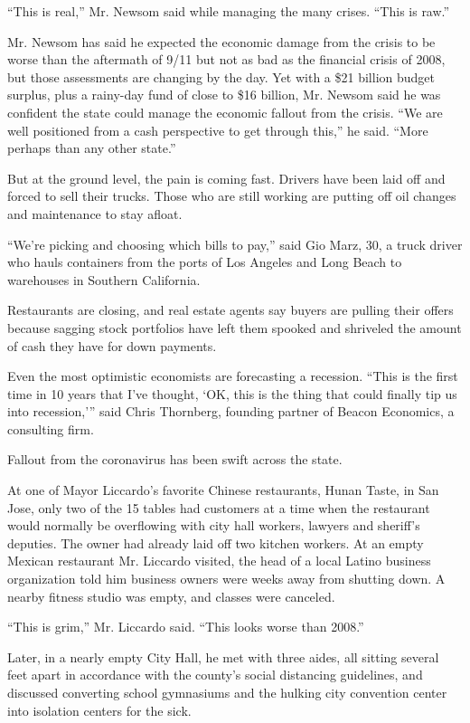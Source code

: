 ``This is real,'' Mr. Newsom said while managing the many crises. ``This
is raw.''

Mr. Newsom has said he expected the economic damage from the crisis to
be worse than the aftermath of 9/11 but not as bad as the financial
crisis of 2008, but those assessments are changing by the day. Yet with
a \$21 billion budget surplus, plus a rainy-day fund of close to \$16
billion, Mr. Newsom said he was confident the state could manage the
economic fallout from the crisis. ``We are well positioned from a cash
perspective to get through this,'' he said. ``More perhaps than any
other state.''

But at the ground level, the pain is coming fast. Drivers have been laid
off and forced to sell their trucks. Those who are still working are
putting off oil changes and maintenance to stay afloat.

``We're picking and choosing which bills to pay,'' said Gio Marz, 30, a
truck driver who hauls containers from the ports of Los Angeles and Long
Beach to warehouses in Southern California.

Restaurants are closing, and real estate agents say buyers are pulling
their offers because sagging stock portfolios have left them spooked and
shriveled the amount of cash they have for down payments.

Even the most optimistic economists are forecasting a recession. ``This
is the first time in 10 years that I've thought, `OK, this is the thing
that could finally tip us into recession,''' said Chris Thornberg,
founding partner of Beacon Economics, a consulting firm.

Fallout from the coronavirus has been swift across the state.

At one of Mayor Liccardo's favorite Chinese restaurants, Hunan Taste, in
San Jose, only two of the 15 tables had customers at a time when the
restaurant would normally be overflowing with city hall workers, lawyers
and sheriff's deputies. The owner had already laid off two kitchen
workers. At an empty Mexican restaurant Mr. Liccardo visited, the head
of a local Latino business organization told him business owners were
weeks away from shutting down. A nearby fitness studio was empty, and
classes were canceled.

``This is grim,'' Mr. Liccardo said. ``This looks worse than 2008.''

Later, in a nearly empty City Hall, he met with three aides, all sitting
several feet apart in accordance with the county's social distancing
guidelines, and discussed converting school gymnasiums and the hulking
city convention center into isolation centers for the sick.

